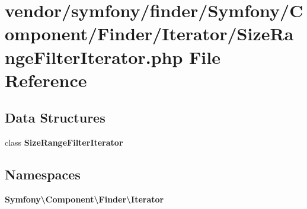 \section{vendor/symfony/finder/\+Symfony/\+Component/\+Finder/\+Iterator/\+Size\+Range\+Filter\+Iterator.php File Reference}
\label{_size_range_filter_iterator_8php}
\subsection*{Data Structures}
\begin{DoxyCompactItemize}
\item 
class {\bf Size\+Range\+Filter\+Iterator}
\end{DoxyCompactItemize}
\subsection*{Namespaces}
\begin{DoxyCompactItemize}
\item 
 {\bf Symfony\textbackslash{}\+Component\textbackslash{}\+Finder\textbackslash{}\+Iterator}
\end{DoxyCompactItemize}
